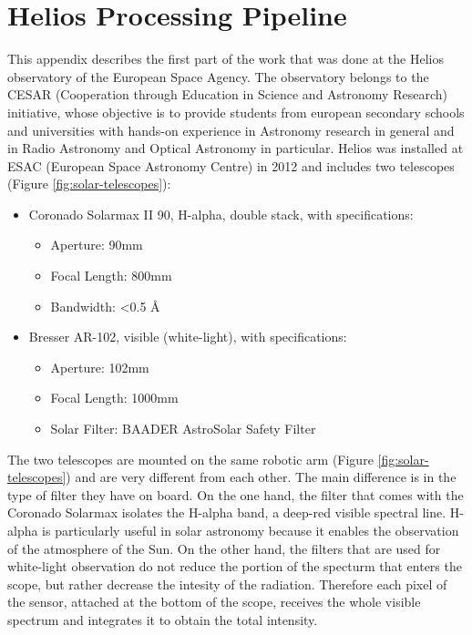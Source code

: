 \chapter{Helios Processing Pipeline}
\label{appendiceC}
\thispagestyle{empty}
This appendix describes the first part of the work that was done at the Helios observatory of the European Space Agency. The observatory belongs to the CESAR (Cooperation through Education in Science and Astronomy Research) initiative, whose objective is to provide students from european secondary schools and universities with hands-on experience in Astronomy research in general and in Radio Astronomy and Optical Astronomy in particular. Helios was installed at ESAC (European Space Astronomy Centre) in 2012 and includes two telescopes (Figure \ref{fig:solar-telescopes}):
\begin{itemize}
  \item Coronado Solarmax II 90, H-alpha, double stack, with specifications:
  \begin{itemize}
    \item Aperture: 90mm
    \item Focal Length: 800mm
    \item Bandwidth: \textless0.5 \AA
  \end{itemize}
  \item Bresser AR-102, visible (white-light), with specifications:
  \begin{itemize}
    \item Aperture: 102mm
    \item Focal Length: 1000mm
    \item Solar Filter: BAADER AstroSolar Safety Filter
  \end{itemize}
\end{itemize}
\bigbreak
\noindent The two telescopes are mounted on the same robotic arm (Figure \ref{fig:solar-telescopes}) and are very different from each other. The main difference is in the type of filter they have on board. On the one hand, the filter that comes with the Coronado Solarmax isolates the H-alpha band, a deep-red visible spectral line. H-alpha is particularly useful in solar astronomy because it enables the observation of the atmosphere of the Sun. On the other hand, the filters that are used for white-light observation do not reduce the portion of the specturm that enters the scope, but rather decrease the intesity of the radiation. Therefore each pixel of the sensor, attached at the bottom of the scope, receives the whole visible spectrum and integrates it to obtain the total intensity.
